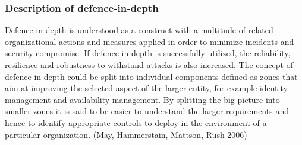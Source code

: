\documentclass{article}
\begin{document}
\subsubsection{Description of defence-in-depth}
Defence-in-depth is understood as a construct with a multitude of related organizational actions and measures applied in order to minimize incidents and security compromise. If defence-in-depth is successfully utilized, the reliability, resilience and robustness to withstand attacks is also increased. The concept of defence-in-depth could be split into individual components defined as zones that aim at improving the selected aspect of the larger entity, for example identity management and availability management. By splitting the big picture into smaller zones it is said to be easier to understand the larger requirements and hence to identify appropriate controls to deploy in the environment of a particular organization. (May, Hammerstain, Mattson, Rush 2006)
\end{document}
